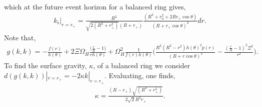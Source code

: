 \documentclass[11pt]{article}
\begin{document}
which at the future event horizon for a balanced ring gives, 
\begin{align}
k_{\flat}|_{r=r_+}=\frac{R^2}{\sqrt{2(R^2+r_+^2)}(R+r_+)}\frac{(R^2+r^2_0+2Rr_+\cos\theta)}{(R+r_+\cos\theta)^2}dr.
\end{align}
Note that,
\begin{align}
g(k,k)=-\frac{f(r)}{h(\theta)}+2\Xi\Omega_H\frac{\big(\frac{r}{R}-1\big)}{rh(\theta)}+\Omega_H^2\frac{1}{f(r)h(\theta)}\Big(\frac{R^2(R^2-r^2)h(\theta)^2p(r)}{(R+r\cos\theta)^2}-\frac{(\frac{r}{R}-1)^2\Xi^2}{r^2}\Big).
\end{align}
To find the surface gravity, $\kappa$, of a balanced ring we consider $d(g(k,k))|_{r=r_+}=-2\kappa k|_{r=r_+}$. Evaluating, one finds, 
\begin{align}
\kappa=\frac{(R-r_+)\sqrt{(R^2+r_+^2)}}{2\sqrt{2}R^2r_+}.
\end{align}
\end{document}
